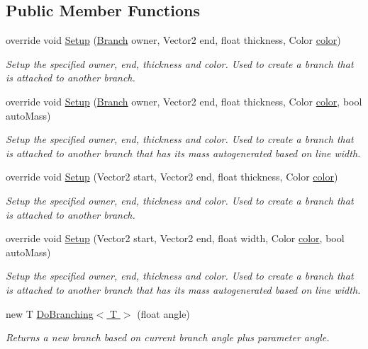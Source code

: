 \subsection*{Public Member Functions}
\begin{DoxyCompactItemize}
\item 
override void \hyperlink{class_fractal_tree_1_1_moving_branch_impl_a52861b34bb8a9550c6790bab90509660}{Setup} (\hyperlink{interface_fractal_tree_1_1_branch}{Branch} owner, Vector2 end, float thickness, Color \hyperlink{class_fractal_tree_1_1_stationary_branch_a265ca67d50299986adb192386fc7b932}{color})
\begin{DoxyCompactList}\small\item\em Setup the specified owner, end, thickness and color. Used to create a branch that is attached to another branch. \end{DoxyCompactList}\item 
override void \hyperlink{class_fractal_tree_1_1_moving_branch_impl_a73649451c7fbfa0793e0a1528e301215}{Setup} (\hyperlink{interface_fractal_tree_1_1_branch}{Branch} owner, Vector2 end, float thickness, Color \hyperlink{class_fractal_tree_1_1_stationary_branch_a265ca67d50299986adb192386fc7b932}{color}, bool auto\+Mass)
\begin{DoxyCompactList}\small\item\em Setup the specified owner, end, thickness and color. Used to create a branch that is attached to another branch that has its mass autogenerated based on line width. \end{DoxyCompactList}\item 
override void \hyperlink{class_fractal_tree_1_1_moving_branch_impl_aeea52b05117e613e0dd6c9ee5fbafb58}{Setup} (Vector2 start, Vector2 end, float thickness, Color \hyperlink{class_fractal_tree_1_1_stationary_branch_a265ca67d50299986adb192386fc7b932}{color})
\begin{DoxyCompactList}\small\item\em Setup the specified owner, end, thickness and color. Used to create a branch that is attached to another branch. \end{DoxyCompactList}\item 
override void \hyperlink{class_fractal_tree_1_1_moving_branch_impl_a4e7cde65899abaf121a906d06874c330}{Setup} (Vector2 start, Vector2 end, float width, Color \hyperlink{class_fractal_tree_1_1_stationary_branch_a265ca67d50299986adb192386fc7b932}{color}, bool auto\+Mass)
\begin{DoxyCompactList}\small\item\em Setup the specified owner, end, thickness and color. Used to create a branch that is attached to another branch that has its mass autogenerated based on line width. \end{DoxyCompactList}\item 
new T \hyperlink{class_fractal_tree_1_1_moving_branch_impl_a7f7776446fa70aac8efb669f9e41a4af}{Do\+Branching$<$ T $>$} (float angle)
\begin{DoxyCompactList}\small\item\em Returns a new branch based on current branch angle plus parameter angle. \end{DoxyCompactList}\end{DoxyCompactItemize}
